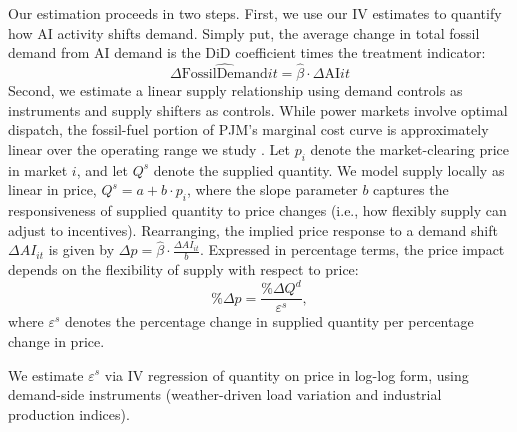 \documentclass[a4paper,fleqn,longmktitle]{cas-sc}
\newcommand{\nb}[1]{\textcolor{blue}{NB[#1]}}
\theoremstyle{plain}
\theoremstyle{definition}
\begin{document}
Our estimation proceeds in two steps. First, we use our IV estimates to quantify how AI activity shifts demand. Simply put, the average change in total fossil demand from AI demand is the DiD coefficient times the treatment indicator:
\begin{equation}
\Delta \widehat{\text{FossilDemand}}{it} = \hat{\beta} \cdot \Delta \text{AI}{it}
\label{eq:demand-change}
\end{equation}
Second, we estimate a linear supply relationship using demand controls as instruments and supply shifters as controls. While power markets involve optimal dispatch, the fossil-fuel portion of PJM’s marginal cost curve is approximately linear over the operating range we study \cite{PJM_DataMiner2_2025}.
Let $p_i$ denote the market-clearing price in market $i$, and let $Q^s$ denote
the supplied quantity. We model supply locally as linear in price,
$Q^s = a + b \cdot p_i$, where the slope parameter $b$ captures the
responsiveness of supplied quantity to price changes (i.e., how flexibly
supply can adjust to incentives). Rearranging, the implied price response to a
demand shift $\Delta AI_{it}$ is given by
$\Delta p = \hat{\beta} \cdot \frac{\Delta AI_{it}}{b}$. Expressed in percentage
terms, the price impact depends on the flexibility of supply with respect to
price:
\begin{equation}
\% \Delta p = \frac{\% \Delta Q^d}{\varepsilon^s},
\label{eq:price-impact-elasticity}
\end{equation}
where $\varepsilon^s$ denotes the percentage change in supplied quantity per
percentage change in price.


We estimate $\varepsilon^s$ via IV regression of quantity on price in log-log form, using demand-side instruments (weather-driven load variation and industrial production indices).
\end{document}
